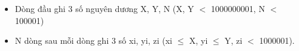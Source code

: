 \begin{itemize}
	\item     Dòng đầu ghi 3 số nguyên dương X, Y, N (X, Y $<$ 1000000001, N $<$ 100001)   
	\item     N dòng sau mỗi dòng ghi 3 số xi, yi, zi (xi  $\le$  X, yi  $\le$  Y, zi $<$ 1000001).   
\end{itemize}